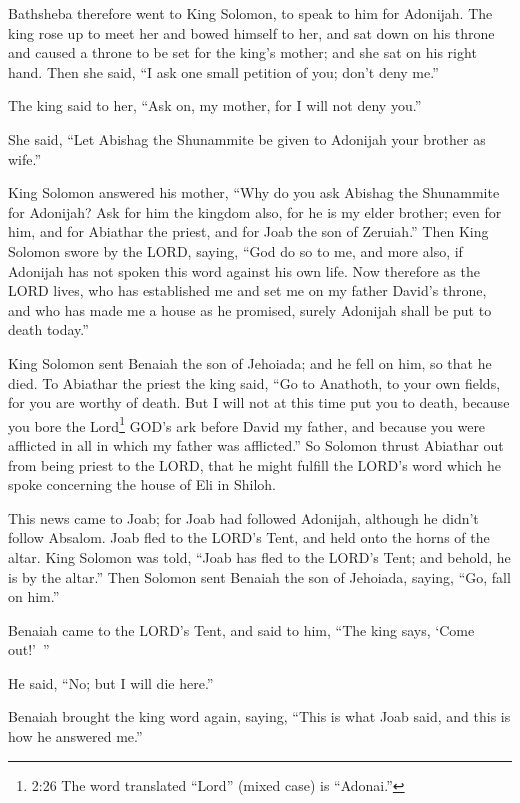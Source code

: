 \myverse{}Bathsheba therefore went to King Solomon, to speak to him for
Adonijah. The king rose up to meet her and bowed himself to her, and sat down on his throne and caused
a throne to be set for the king’s mother; and she sat on his right hand.
\myverse{}Then she said, “I ask one small petition of you; don’t deny me.”

The king said to her, “Ask on, my mother, for I will not deny you.”

\myverse{}She said, “Let Abishag the Shunammite be given to Adonijah your
brother as wife.”

\myverse{}King Solomon answered his mother, “Why do you ask Abishag the
Shunammite for Adonijah? Ask for him the kingdom also, for he is my elder brother; even for him, and for
Abiathar the priest, and for Joab the son of Zeruiah.”
\myverse{}Then King Solomon swore by the LORD, saying, “God do so to me, and more also,
if Adonijah has not spoken this word against his own life.
\myverse{}Now therefore as the LORD lives, who has established me and set me on my father
David’s throne, and who has made me a house as he promised, surely Adonijah shall be put to death today.”

\myverse{}King Solomon sent Benaiah the son of Jehoiada; and he fell on
him, so that he died.
\myverse{}To Abiathar the priest the king said, “Go to Anathoth, to your own fields,
for you are worthy of death. But I will not at this time put you to death, because you bore the Lord\footnote{2:26 The word translated “Lord” (mixed case) is “Adonai.”} GOD’s ark before David my father,
and because you were afflicted in all in which my father was afflicted.”
\myverse{}So Solomon thrust Abiathar out from being priest to the LORD, that he might
fulfill the LORD’s word which he spoke concerning the house of Eli in Shiloh.

\myverse{}This news came to Joab; for Joab had followed Adonijah, although
he didn’t follow Absalom. Joab fled to the LORD’s Tent, and held onto the horns of the altar.
\myverse{}King Solomon was told, “Joab has fled to the LORD’s Tent; and behold, he is
by the altar.” Then Solomon sent Benaiah the son of Jehoiada, saying, “Go, fall on him.”

\myverse{}Benaiah came to the LORD’s Tent, and said to him, “The king says,
‘Come out!’ ”

He said, “No; but I will die here.”

Benaiah brought the king word again, saying, “This is what Joab said, and this is how he
answered me.”

